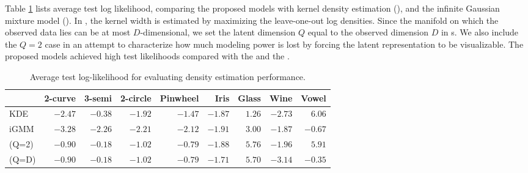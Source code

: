 Table \ref{tab:likelihood} lists average test log likelihood, comparing the proposed models with kernel density estimation (\KDE{}),
and the infinite Gaussian mixture model (\iGMM{}).
In \KDE{}, the kernel width is estimated by maximizing the leave-one-out log densities.
Since the manifold on which the observed data lies can be at most $D$-dimensional, we set the latent dimension $Q$ equal to the observed dimension $D$ in \iwmm{}s.
We also include the $Q = 2$ case in an attempt to characterize how much modeling power is lost by forcing the latent representation to be visualizable. 
The proposed models achieved high test likelihoods compared with the \KDE{} and the \iGMM{}.

\begin{table}[ht!]
\centering
\caption[Predictive log-likelihood comparison]
{Average test log-likelihood for evaluating density estimation performance.}
\label{tab:likelihood}
\begin{tabular}{lrrrrrrrr}
\hline
& 2-curve & 3-semi & 2-circle & Pinwheel & Iris  & Glass  & Wine  & Vowel  \\
\hline 
KDE & $-2.47$ & $-0.38$ & $-1.92$ & $-1.47$ & $\mathbf{-1.87}$ & $1.26$ & $-2.73$ & $\mathbf{6.06}$ \\
iGMM & $-3.28$ & $-2.26$ & $-2.21$ & $-2.12$ & $-1.91$ & $3.00$ & $\mathbf{-1.87}$ & $-0.67$ \\
\iwmm{}(Q=2) & $\mathbf{-0.90}$ & $\mathbf{-0.18}$ & $\mathbf{-1.02}$ & $\mathbf{-0.79}$ & $\mathbf{-1.88}$ & $\mathbf{5.76}$ & $\mathbf{-1.96}$ & $\mathbf{5.91}$ \\
\iwmm{}(Q=D) & $\mathbf{-0.90}$ & $\mathbf{-0.18}$ & $\mathbf{-1.02}$ & $\mathbf{-0.79}$ & $\mathbf{-1.71}$ & $\mathbf{5.70}$ & $-3.14$ & $-0.35$ \\
\hline
\end{tabular}
\end{table}

